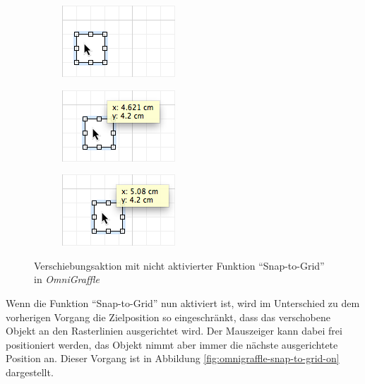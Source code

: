 \begin{figure}[hbt]
    \newcommand{\subfigurewidth}{0.33\textwidth}
    \newcommand{\graphicswidth}{0.95\linewidth}
    \begin{subfigure}{\subfigurewidth}
        \centering
        \includegraphics[width=\graphicswidth]{assets/omnigraffle-snap-to-grid-off-a}
        \caption{}
    \end{subfigure}
    \begin{subfigure}{\subfigurewidth}
        \centering
        \includegraphics[width=\graphicswidth]{assets/omnigraffle-snap-to-grid-off-b}
        \caption{}
    \end{subfigure}
    \begin{subfigure}{\subfigurewidth}
        \centering
        \includegraphics[width=\graphicswidth]{assets/omnigraffle-snap-to-grid-off-c}
        \caption{}
    \end{subfigure}
    \caption{Verschiebungsaktion mit nicht aktivierter Funktion \enquote{Snap-to-Grid} in \textit{OmniGraffle}}
    \label{fig:omnigraffle-snap-to-grid-off}
\end{figure}

Wenn die Funktion \enquote{Snap-to-Grid} nun aktiviert ist, wird im Unterschied zu dem vorherigen Vorgang die Zielposition so eingeschränkt, dass das verschobene Objekt an den Rasterlinien ausgerichtet wird. Der Mauszeiger kann dabei frei positioniert werden, das Objekt nimmt aber immer die nächste ausgerichtete Position an. Dieser Vorgang ist in Abbildung \ref{fig:omnigraffle-snap-to-grid-on} dargestellt.

